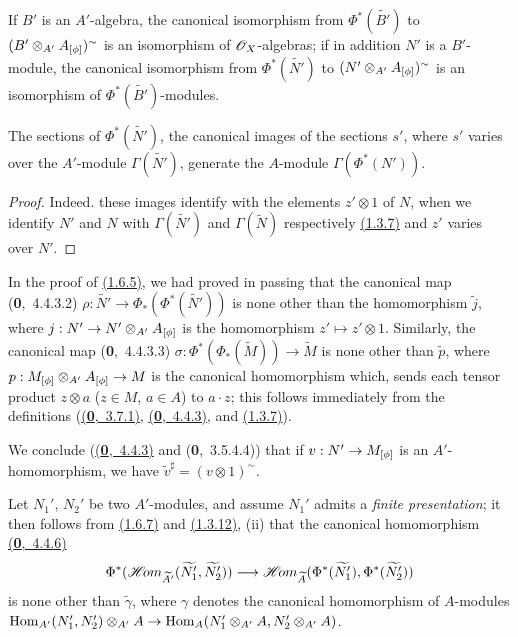 If $B'$ is an $A'$-algebra, the canonical isomorphism from $\Phi^*(\widetilde{B'})$ to
$(B'\otimes_{A'}A_{[\phi]})^\sim$ is an isomorphism of $\mathscr{O}_X$-algebras; if in addition $N'$
is a $B'$-module, the canonical isomorphism from $\Phi^*(\widetilde{N'})$ to
$(N'\otimes_{A'}A_{[\phi]})^\sim$ is an isomorphism of $\Phi^*(\widetilde{B'})$-modules.

\begin{cor}[1.6.6]
\label{cor-1.1.6.6}
The sections of $\Phi^*(\widetilde{N'})$, the canonical images of the sections $s'$, where
$s'$ varies over the $A'$-module $\Gamma(\widetilde{N'})$, generate the $A$-module
$\Gamma(\Phi^*(N'))$.
\end{cor}

\begin{proof}
\label{proof-cor-1.1.6.6}
Indeed. these images identify with the elements $z'\otimes 1$ of $N$, when we identify $N'$
and $N$ with $\Gamma(\widetilde{N'})$ and $\Gamma(\widetilde{N})$ respectively
\hyperref[thm-1.1.3.7]{(1.3.7)} and $z'$ varies over $N'$.
\end{proof}

\begin{env}[1.6.7]
\label{env-1.1.6.7}
In the proof of \hyperref[prop-1.1.6.5]{(1.6.5)}, we had proved in passing that the canonical map
(\textbf{0},~4.4.3.2) $\rho:\widetilde{N'}\to\Phi_*(\Phi^*(\widetilde{N'}))$ is none other
than the homomorphism $\widetilde{j}$,
where $j:N'\to N'\otimes_{A'}A_{[\phi]}$ is the homomorphism $z'\mapsto z'\otimes 1$.
Similarly, the canonical map (\textbf{0},~4.4.3.3)
$\sigma:\Phi^*(\Phi_*(\widetilde{M}))\to\widetilde{M}$ is none other than $\widetilde{p}$,
where $p:M_{[\phi]}\otimes_{A'}A_{[\phi]}\to M$ is the canonical homomorphism which, sends
each tensor product $z\otimes a$ ($z\in M$, $a\in A$) to $a\cdot z$; this follows immediately
from the definitions (\hyperref[env-0.3.7.1]{(\textbf{0},~3.7.1)}, \hyperref[env-0.4.4.3]{(\textbf{0},~4.4.3)},
and \hyperref[thm-1.1.3.7]{(1.3.7)}).

We conclude (\hyperref[env-0.4.4.3]{(\textbf{0},~4.4.3)} and (\textbf{0},~3.5.4.4)) that if $v:N'\to M_{[\phi]}$ is an
$A'$-homomorphism, we have $\widetilde{v}^\sharp=(v\otimes 1)^\sim$.
\end{env}

\begin{env}[1.6.8]
\label{env-1.1.6.8}
Let $N_1'$, $N_2'$ be two $A'$-modules, and assume $N_1'$ admits a {\em finite
presentation}; it then follows from \hyperref[env-1.1.6.7]{(1.6.7)} and \hyperref[cor-1.1.3.12]{(1.3.12)}, (ii) that the
canonical homomorphism \hyperref[env-0.4.4.6]{(\textbf{0},~4.4.6)}
\[
  \Phi^*(\mathscr{H}\!{om}_{\widetilde{A'}}(\widetilde{N_1'},\widetilde{N_2'}))
  \longrightarrow\mathscr{H}\!{om}_{\widetilde{A}}(\Phi^*(\widetilde{N_1'}),\Phi^*(\widetilde{N_2'}))
\]
is none other than $\widetilde{\gamma}$, where $\gamma$ denotes the canonical homomorphism
of $A$-modules
${\mathop{\mathrm{Hom}}\nolimits}_{A'}(N_1',N_2')\otimes_{A'}A\to{\mathop{\mathrm{Hom}}\nolimits}_A(N_1'\otimes_{A'}A,N_2'\otimes_{A'}A)$.
\end{env}


